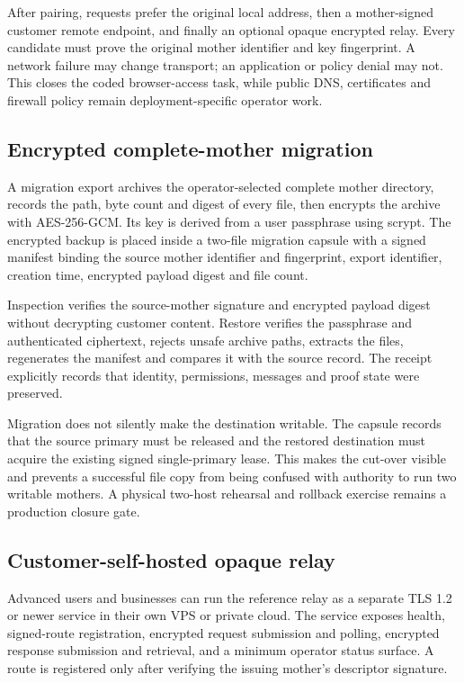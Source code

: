After pairing, requests prefer the original local address, then a mother-signed
customer remote endpoint, and finally an optional opaque encrypted relay.  Every
candidate must prove the original mother identifier and key fingerprint.  A network
failure may change transport; an application or policy denial may not.  This closes
the coded browser-access task, while public DNS, certificates and firewall policy
remain deployment-specific operator work.

\subsection{Encrypted complete-mother migration}

A migration export archives the operator-selected complete mother directory, records
the path, byte count and digest of every file, then encrypts the archive with
AES-256-GCM.  Its key is derived from a user passphrase using scrypt.  The encrypted
backup is placed inside a two-file migration capsule with a signed manifest binding
the source mother identifier and fingerprint, export identifier, creation time,
encrypted payload digest and file count.

Inspection verifies the source-mother signature and encrypted payload digest without
decrypting customer content.  Restore verifies the passphrase and authenticated
ciphertext, rejects unsafe archive paths, extracts the files, regenerates the
manifest and compares it with the source record.  The receipt explicitly records
that identity, permissions, messages and proof state were preserved.

Migration does not silently make the destination writable.  The capsule records that
the source primary must be released and the restored destination must acquire the
existing signed single-primary lease.  This makes the cut-over visible and prevents
a successful file copy from being confused with authority to run two writable
mothers.  A physical two-host rehearsal and rollback exercise remains a production
closure gate.

\subsection{Customer-self-hosted opaque relay}

Advanced users and businesses can run the reference relay as a separate TLS 1.2 or
newer service in their own VPS or private cloud.  The service exposes health,
signed-route registration, encrypted request submission and polling, encrypted
response submission and retrieval, and a minimum operator status surface.  A route
is registered only after verifying the issuing mother's descriptor signature.

